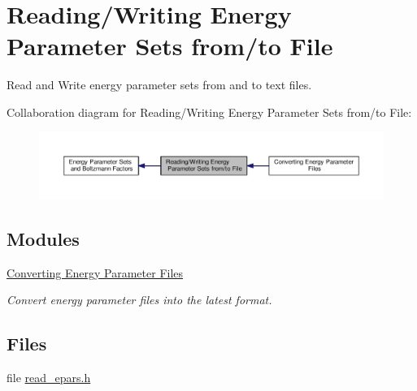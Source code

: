 \hypertarget{group__energy__parameters__rw}{\section{Reading/\-Writing Energy Parameter Sets from/to File}
\label{group__energy__parameters__rw}
}


Read and Write energy parameter sets from and to text files.  


Collaboration diagram for Reading/\-Writing Energy Parameter Sets from/to File\-:
\nopagebreak
\begin{figure}[H]
\begin{center}
\leavevmode
\includegraphics[width=350pt]{group__energy__parameters__rw}
\end{center}
\end{figure}
\subsection*{Modules}
\begin{DoxyCompactItemize}
\item 
\hyperlink{group__energy__parameters__convert}{Converting Energy Parameter Files}
\begin{DoxyCompactList}\small\item\em Convert energy parameter files into the latest format. \end{DoxyCompactList}\end{DoxyCompactItemize}
\subsection*{Files}
\begin{DoxyCompactItemize}
\item 
file \hyperlink{read__epars_8h}{read\-\_\-epars.\-h}
\end{DoxyCompactItemize}
